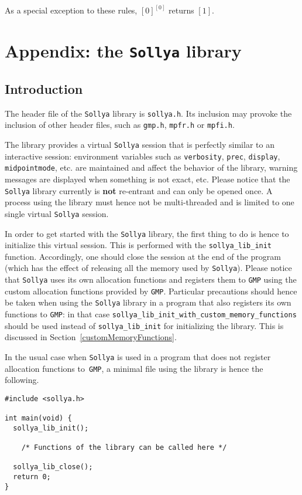 \documentclass[a4paper]{article}
\newcommand{\sollya}{\texttt{Sollya}\xspace}
\begin{document}
As a special exception to these rules, $[0]^{[0]}$ returns $[1]$.

\newpage
\section{Appendix: the \sollya library}
\label{Libsollya}
 \subsection{Introduction}
The header file of the \sollya library is \texttt{sollya.h}. Its inclusion may provoke the inclusion of other header files, such as \texttt{gmp.h}, \texttt{mpfr.h} or \texttt{mpfi.h}.

The library provides a virtual \sollya session that is perfectly similar to an interactive session: environment variables such as \texttt{verbosity}, \texttt{prec}, \texttt{display}, \texttt{midpointmode}, etc. are maintained and affect the behavior of the library, warning messages are displayed when something is not exact, etc. Please notice that the \sollya library currently is \textbf{not} re-entrant and can only be opened once. A process using the library must hence not be multi-threaded and is limited to one single virtual \sollya session.

In order to get started with the \sollya library, the first thing to do is hence to initialize this virtual session. This is performed with the \verb|sollya_lib_init| function. Accordingly, one should close the session at the end of the program (which has the effect of releasing all the memory used by \sollya). Please notice that \sollya uses its own allocation functions and registers them to \verb|GMP| using the custom allocation functions provided by \verb|GMP|. Particular precautions should hence be taken when using the \sollya library in a program that also registers its own functions to \verb|GMP|: in that case \verb|sollya_lib_init_with_custom_memory_functions| should be used instead of \verb|sollya_lib_init| for initializing the library. This is discussed in Section~\ref{customMemoryFunctions}.

In the usual case when \sollya is used in a program that does not register allocation functions to~\verb|GMP|, a minimal file using the library is hence the following.

\begin{center}\begin{minipage}{15cm}\begin{Verbatim}[frame=single]
#include <sollya.h>

int main(void) {
  sollya_lib_init();

    /* Functions of the library can be called here */

  sollya_lib_close();
  return 0;
}
\end{Verbatim}
\end{minipage}\end{center}
\end{document}
